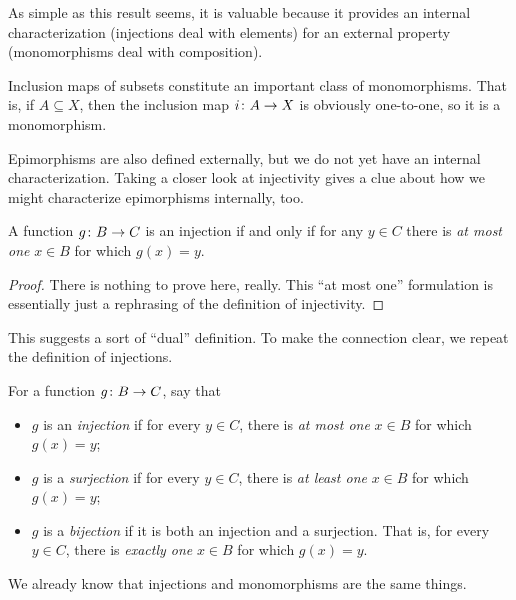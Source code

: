 As simple as this result seems, it is valuable because it provides an internal characterization (injections deal with elements) for an external property (monomorphisms deal with composition).

Inclusion maps of subsets constitute an important class of monomorphisms. That is,
if $A\subseteq X$, then the inclusion map ${i}\colon{A}\to{X}$ is obviously one-to-one, so it is a monomorphism.

Epimorphisms are also defined externally, but we do not yet have an internal characterization. 
Taking a closer look at injectivity gives a clue about how we might characterize epimorphisms internally, too.

\begin{lemma}
	A function ${g}\colon{B}\to{C}$ is an injection if and only if for any $y\in C$ there is \emph{at most one} $x\in B$ for which $g(x)=y$.
	
	\begin{proof}
There is nothing to prove here, really. This ``at most one'' formulation is essentially just a rephrasing of the definition of injectivity.
	\end{proof}
\end{lemma}

This suggests a sort of ``dual'' definition. To make the connection clear, we repeat the definition of injections.

\begin{defn}
	For a function ${g}\colon{B}\to{C}$, say that
	\begin{itemize}
		\item $g$ is an \emph{injection} if for every $y\in C$, there is \emph{at most one} $x\in B$ for which $g(x)=y$;
		\item $g$ is a \emph{surjection} if for every $y\in C$, there is \emph{at least one} $x\in B$ for which $g(x)=y$;
		\item $g$ is a \emph{bijection} if it is both an injection and a surjection. That is, for every $y\in C$, there is \emph{exactly one} $x\in B$ for which $g(x)=y$. 
	\end{itemize}  
\end{defn}

We already know that injections and monomorphisms are the same things.

